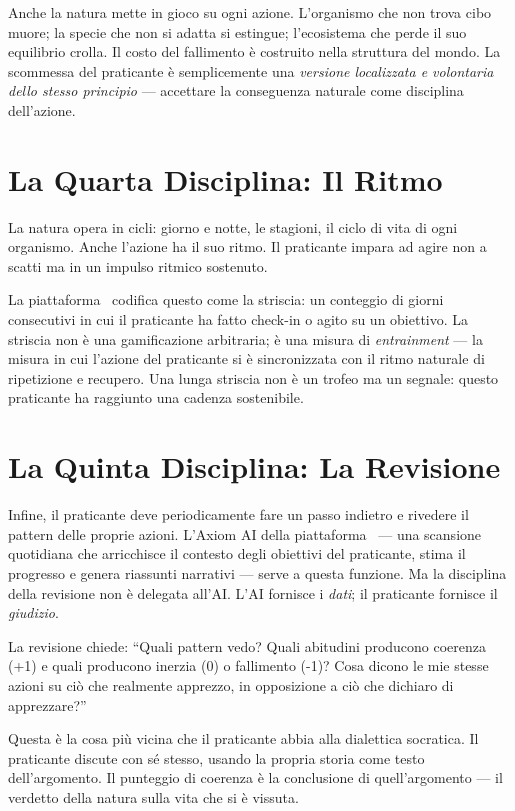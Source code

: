 Anche la natura mette in gioco su ogni azione. L'organismo che non trova
cibo muore; la specie che non si adatta si estingue; l'ecosistema che
perde il suo equilibrio crolla. Il costo del fallimento \`e costruito
nella struttura del mondo. La scommessa del praticante \`e semplicemente
una \emph{versione localizzata e volontaria dello stesso principio} ---
accettare la conseguenza naturale come disciplina dell'azione.

\section{La Quarta Disciplina: Il Ritmo}

La natura opera in cicli: giorno e notte, le stagioni, il ciclo di vita
di ogni organismo. Anche l'azione ha il suo ritmo. Il praticante impara
ad agire non a scatti ma in un impulso ritmico sostenuto.

La piattaforma \praxis\ codifica questo come la striscia: un conteggio
di giorni consecutivi in cui il praticante ha fatto check-in o agito su
un obiettivo. La striscia non \`e una gamificazione arbitraria; \`e una
misura di \emph{entrainment} --- la misura in cui l'azione del praticante
si \`e sincronizzata con il ritmo naturale di ripetizione e recupero.
Una lunga striscia non \`e un trofeo ma un segnale: questo praticante ha
raggiunto una cadenza sostenibile.

\section{La Quinta Disciplina: La Revisione}

Infine, il praticante deve periodicamente fare un passo indietro e
rivedere il pattern delle proprie azioni. L'Axiom AI della piattaforma
\praxis\ --- una scansione quotidiana che arricchisce il contesto degli
obiettivi del praticante, stima il progresso e genera riassunti narrativi
--- serve a questa funzione. Ma la disciplina della revisione non \`e
delegata all'AI. L'AI fornisce i \emph{dati}; il praticante fornisce il
\emph{giudizio}.

La revisione chiede: ``Quali pattern vedo? Quali abitudini producono
coerenza (+1) e quali producono inerzia (0) o fallimento (-1)? Cosa dicono
le mie stesse azioni su ci\`o che realmente apprezzo, in opposizione a
ci\`o che dichiaro di apprezzare?''

Questa \`e la cosa pi\`u vicina che il praticante abbia alla dialettica
socratica. Il praticante discute con s\'e stesso, usando la propria
storia come testo dell'argomento. Il punteggio di coerenza \`e la
conclusione di quell'argomento --- il verdetto della natura sulla vita
che si \`e vissuta.

